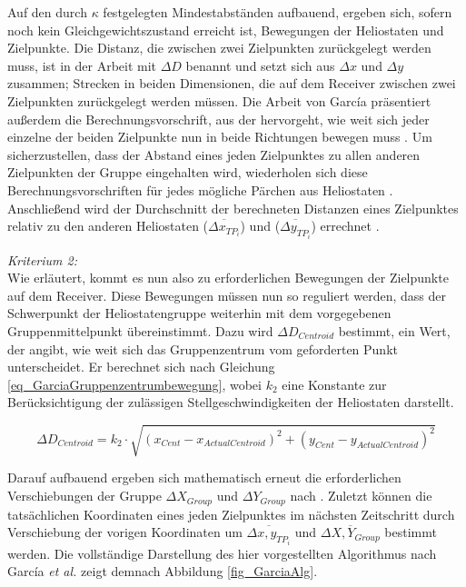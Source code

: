 Auf den durch $\kappa$ festgelegten Mindestabständen aufbauend, ergeben sich, sofern noch kein Gleichgewichtszustand erreicht ist, Bewegungen der Heliostaten und Zielpunkte.
Die Distanz, die zwischen zwei Zielpunkten zurückgelegt werden muss, ist in der Arbeit mit $\Delta D$ benannt und setzt sich aus $\Delta x$ und $\Delta y$ zusammen; Strecken in beiden Dimensionen, die auf dem Receiver zwischen zwei Zielpunkten zurückgelegt werden müssen.
Die Arbeit von García präsentiert außerdem die Berechnungsvorschrift, aus der hervorgeht, wie weit sich jeder einzelne der beiden Zielpunkte nun in beide Richtungen bewegen muss \cite[S.9-10]{Garcia2}.
Um sicherzustellen, dass der Abstand eines jeden Zielpunktes zu allen anderen Zielpunkten der Gruppe eingehalten wird, wiederholen sich diese Berechnungsvorschriften für jedes mögliche Pärchen aus Heliostaten \cite[S.9]{Garcia2}.
Anschließend wird der Durchschnitt der berechneten Distanzen eines Zielpunktes relativ zu den anderen Heliostaten ($\overline{\Delta x_{TP_i}}$) und ($\overline{\Delta y_{TP_i}}$) errechnet \cite[S.10]{Garcia2}.


\textit{Kriterium 2:}\\
Wie erläutert, kommt es nun also zu erforderlichen Bewegungen der Zielpunkte auf dem Receiver.
Diese Bewegungen müssen nun so reguliert werden, dass der Schwerpunkt der Heliostatengruppe weiterhin mit dem vorgegebenen Gruppenmittelpunkt übereinstimmt.
Dazu wird $\Delta D_{Centroid}$ bestimmt, ein Wert, der angibt, wie weit sich das Gruppenzentrum vom geforderten Punkt unterscheidet.
Er berechnet sich nach Gleichung \ref{eq_GarciaGruppenzentrumbewegung}, wobei $k_2$ eine Konstante zur Berücksichtigung der zulässigen Stellgeschwindigkeiten der Heliostaten darstellt. \cite[S.10]{Garcia2}

\begin{equation} \label{eq_GarciaGruppenzentrumbewegung}
    \Delta D_{Centroid} = k_2 \cdot \sqrt{\left(x_{Cent}-x_{Actual Centroid}\right)^2+\left(y_{Cent}-y_{Actual Centroid}\right)^2}
\end{equation}

Darauf aufbauend ergeben sich mathematisch erneut die erforderlichen Verschiebungen der Gruppe $\Delta X_{Group}$ und $\Delta Y_{Group}$ nach \cite[S.10]{Garcia2}.
Zuletzt können die tatsächlichen Koordinaten eines jeden Zielpunktes im nächsten Zeitschritt durch Verschiebung der vorigen Koordinaten um $\overline{\Delta x,y_{TP_i}}$ und $\overline{\Delta X,Y_{Group}}$ bestimmt werden.
Die vollständige Darstellung des hier vorgestellten Algorithmus nach García \textit{et al.} \cite{Garcia2} zeigt demnach Abbildung \ref{fig_GarciaAlg}.

